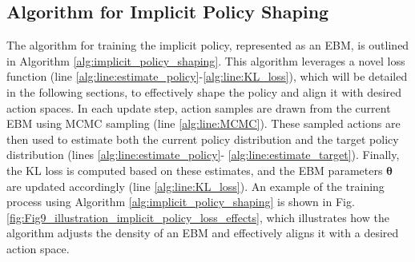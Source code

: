 \subsection{Algorithm for Implicit Policy Shaping}
\label{sec:sub:algorithm_implicit_policy_shaping}
The algorithm for training the implicit policy, represented as an EBM, is outlined in Algorithm \ref{alg:implicit_policy_shaping}. 
This algorithm leverages a novel loss function (line \ref{alg:line:estimate_policy}-\ref{alg:line:KL_loss}), which will be detailed in the following sections, to effectively shape the policy and align it with desired action spaces.
In each update step, action samples are drawn from the current EBM using MCMC sampling (line \ref{alg:line:MCMC}).
These sampled actions are then used to estimate both the current policy distribution and the target policy distribution (lines \ref{alg:line:estimate_policy}- \ref{alg:line:estimate_target}).
Finally, the KL loss is computed based on these estimates, and the EBM parameters ${\bm \theta}$ are updated accordingly (line \ref{alg:line:KL_loss}).
An example of the training process using Algorithm \ref{alg:implicit_policy_shaping} is shown in Fig. \ref{fig:Fig9_illustration_implicit_policy_loss_effects}, which illustrates how the algorithm adjusts the density of an EBM and effectively aligns it with a desired action space.  


